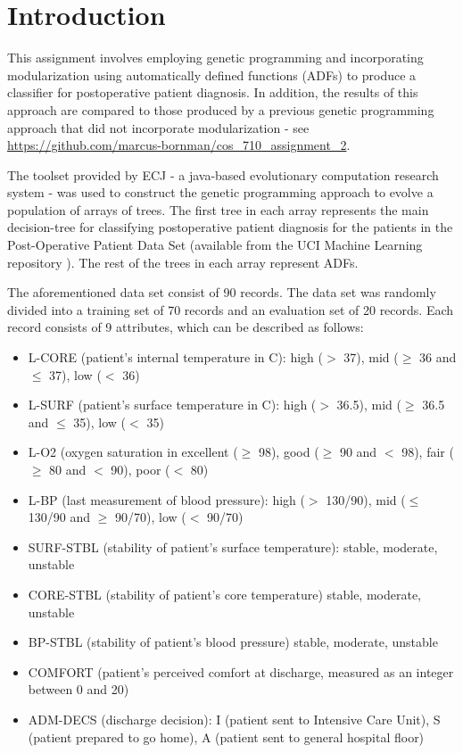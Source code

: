 \section{Introduction}
This assignment involves employing genetic programming and incorporating modularization using automatically defined functions (ADFs) to produce a classifier for postoperative patient diagnosis. In addition, the results of this approach are compared to those produced by a previous genetic programming approach that did not incorporate modularization - see \url{https://github.com/marcus-bornman/cos_710_assignment_2}.

The toolset provided by ECJ \cite{luke2006ecj} - a java-based evolutionary computation research system - was used to construct the genetic programming approach to evolve a population of arrays of trees. The first tree in each array represents the main decision-tree for classifying postoperative patient diagnosis for the patients in the Post-Operative Patient Data Set (available from the UCI Machine Learning repository \cite{Dua:2019}). The rest of the trees in each array represent ADFs.

The aforementioned data set consist of 90 records. The data set was randomly divided into a training set of 70 records and an evaluation set of 20 records. Each record consists of 9 attributes, which can be described as follows:

\begin{itemize}
    \item L-CORE (patient's internal temperature in C):
              high ($>$ 37), mid ($\geq$ 36 and $\leq$ 37), low ($<$ 36)
    \item L-SURF (patient's surface temperature in C):
              high ($>$ 36.5), mid ($\geq$ 36.5 and $\leq$ 35), low ($<$ 35)
    \item L-O2 (oxygen saturation in %
              excellent ($\geq$ 98), good ($\geq$ 90 and $<$ 98),
              fair ($\geq$ 80 and $<$ 90), poor ($<$ 80)
    \item L-BP (last measurement of blood pressure):
              high ($>$ 130/90), mid ($\leq$ 130/90 and $\geq$ 90/70), low ($<$ 90/70)
    \item SURF-STBL (stability of patient's surface temperature):
              stable, moderate, unstable
    \item CORE-STBL (stability of patient's core temperature)
              stable, moderate, unstable
    \item BP-STBL (stability of patient's blood pressure)
              stable, moderate, unstable
    \item COMFORT (patient's perceived comfort at discharge, measured as
              an integer between 0 and 20)
    \item ADM-DECS (discharge decision):
              I (patient sent to Intensive Care Unit),
              S (patient prepared to go home),
              A (patient sent to general hospital floor)
\end{itemize}

